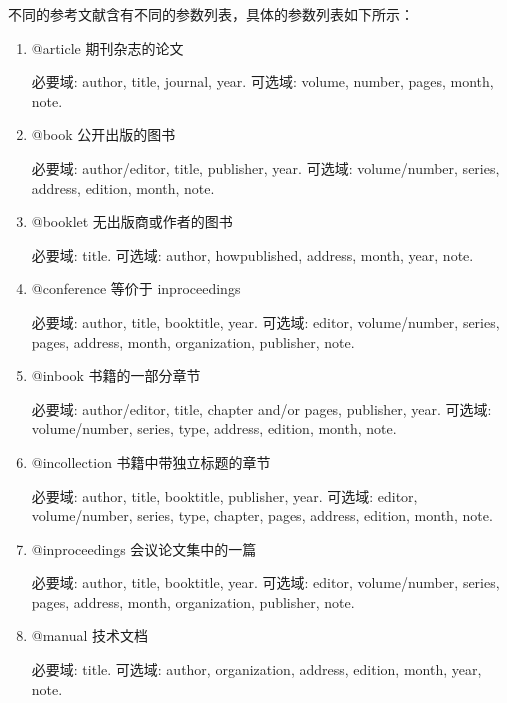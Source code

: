 \documentclass{bjfu}
\begin{document}
不同的参考文献含有不同的参数列表，具体的参数列表如下所示：
\begin{enumerate}[labelsep = .5em, leftmargin = 0pt, itemindent = 3em]
    \item  @article
    期刊杂志的论文
    
    \setlength{\parindent}{2em}必要域: author, title, journal, year.
    可选域: volume, number, pages, month, note.
    
    \item @book
    公开出版的图书
    
    \setlength{\parindent}{2em}必要域: author/editor, title, publisher, year.
    可选域: volume/number, series, address, edition, month, note.
    
    \item @booklet
    无出版商或作者的图书
    
    \setlength{\parindent}{2em}必要域: title.
    可选域: author, howpublished, address, month, year, note.
    
    \item @conference
    等价于 inproceedings
    
    \setlength{\parindent}{2em}必要域: author, title, booktitle, year.
    可选域: editor, volume/number, series, pages, address, month, organization, publisher, note.
    
    \item @inbook
    书籍的一部分章节
    
    \setlength{\parindent}{2em}必要域: author/editor, title, chapter and/or pages, publisher, year.
    可选域: volume/number, series, type, address, edition, month, note.
    
    \item @incollection
    书籍中带独立标题的章节
    
    \setlength{\parindent}{2em}必要域: author, title, booktitle, publisher, year.
    可选域: editor, volume/number, series, type, chapter, pages, address, edition, month, note.
    
    \item @inproceedings
    会议论文集中的一篇
    
    \setlength{\parindent}{2em}必要域: author, title, booktitle, year.
    可选域: editor, volume/number, series, pages, address, month, organization, publisher, note.
    
    \item @manual
    技术文档
    
    \setlength{\parindent}{2em}必要域: title.
    可选域: author, organization, address, edition, month, year, note.
    

\end{enumerate}
\end{document}
